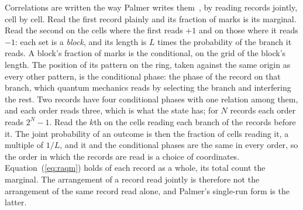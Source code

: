 \documentclass[aps,prd,twocolumn,superscriptaddress,nofootinbib]{revtex4-2}
\begin{document}
Correlations are written the way Palmer writes them~\cite{palmer2026c}, by reading records jointly, cell by cell. Read the first record plainly and its fraction of marks is its marginal. Read the second on the cells where the first reads $+1$ and on those where it reads $-1$: each set is a \emph{block}, and its length is $L$ times the probability of the branch it reads. A block's fraction of marks is the conditional, on the grid of the block's length. The position of its pattern on the ring, taken against the same origin as every other pattern, is the conditional phase: the phase of the record on that branch, which quantum mechanics reads by selecting the branch and interfering the rest. Two records have four conditional phases with one relation among them, and each order reads three, which is what the state has; for $N$ records each order reads $2^N - 1$. Read the $k$th on the cells reading each branch of the records before it. The joint probability of an outcome is then the fraction of cells reading it, a multiple of $1/L$, and it and the conditional phases are the same in every order, so the order in which the records are read is a choice of coordinates. Equation~(\ref{eq:raqm}) holds of each record as a whole, its total count the marginal. The arrangement of a record read jointly is therefore not the arrangement of the same record read alone, and Palmer's single-run form is the latter.
\end{document}
